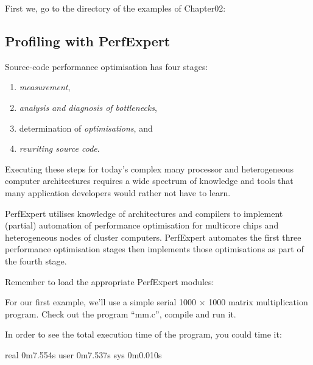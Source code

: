 First we, go to the directory of the examples of Chapter02:

\begin{prompt}
\end{prompt}

\subsection{Profiling with PerfExpert}
\label{subsec:Profiling_with_PerfExpert}

Source-code performance optimisation has four stages:

\begin{enumerate}
  \item  \emph{measurement},
  \item  \emph{analysis and diagnosis of bottlenecks},
  \item  determination of \emph{optimisations}, and
  \item  \emph{rewriting source code}.
\end{enumerate}

Executing these steps for today's complex many processor and heterogeneous computer architectures requires a wide spectrum of knowledge and tools that many application developers would rather not have to learn.

PerfExpert utilises knowledge of architectures and compilers to implement (partial) automation of performance optimisation for multicore chips and heterogeneous nodes of cluster computers. PerfExpert automates the first three performance optimisation stages then implements those optimisations as part of the fourth stage.

Remember to load the appropriate PerfExpert modules:

\begin{prompt}
\end{prompt}

For our first example, we'll use a simple serial 1000 $\times$ 1000 matrix multiplication program. Check out the program ``mm.c'', compile and run it.

\begin{prompt}
\end{prompt}

In order to see the total execution time of the program, you could time it:

\begin{prompt}
real 0m7.554s
user 0m7.537s
sys 0m0.010s
\end{prompt}

